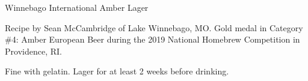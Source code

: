 \stylesection{\styleinternationalamberlager}

\begin{recipe}{Winnebago International Amber Lager}

\begin{aboutblock}
Recipe by Sean McCambridge of Lake Winnebago, MO. Gold medal in Category \#4: Amber
European Beer during the 2019 National Homebrew Competition in Providence, RI.
\sourceaha
\end{aboutblock}


\begin{methodandtiming}
 
\begin{mashsteps}
\end{mashsteps}

\begin{fermentationsteps}
\end{fermentationsteps}

\begin{directions}
Fine with gelatin. Lager for at least 2 weeks before drinking.
\end{directions}

\end{methodandtiming}

\recipebreak

\begin{ingredientsblock}

\begin{malts}
\end{malts}

\begin{hops}
\end{hops}


\end{ingredientsblock}

\end{recipe}
